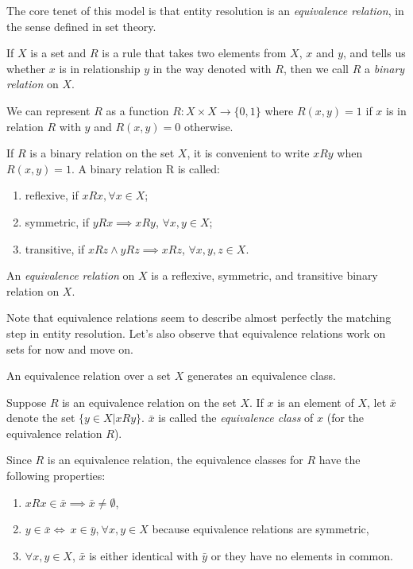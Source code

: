 \documentclass[journal]{IEEEtran}
\begin{document}
    The core tenet of this model is that entity resolution is an \textit{
    equivalence relation}, in the sense defined in set theory.
    
    \begin{defn} If $X$ is a set and $R$ is a rule that takes two elements from
    $X$, $x$ and $y$, and tells us whether $x$ is in relationship $y$ in the way
    denoted with $R$, then we call $R$ a \textit{binary relation} on
    $X$\cite{hoffman1971linear}.
    \end{defn}

    We can represent $R$ as a function $R:X \times X \rightarrow \{0,1\}$ where
    $R(x,y)=1$ if $x$ is in relation $R$ with $y$ and $R(x,y)=0$ otherwise.
    
    \begin{defn}If $R$ is a binary relation on the set $X$, it is convenient to
    write $xRy$ when $R(x, y) = 1$.
    A binary relation R is called:

    \begin{enumerate}
        \item reflexive, if $xRx, \forall x \in X$;
        \item symmetric, if $yRx \implies xRy$, $\forall x,y \in X$;
        \item transitive, if $xRz \land yRz \implies xRz$, $\forall x,y,z \in X$.
    \end{enumerate}

    An \textit{equivalence relation} on $X$ is a reflexive, symmetric, and
    transitive binary relation on $X$\cite{hoffman1971linear}.
    \end{defn}

    Note that equivalence relations seem to describe almost perfectly the
    matching step in entity resolution.
    Let's also observe that equivalence relations work on sets for now and move
    on.

    An equivalence relation over a set $X$ generates an equivalence class.

    \begin{defn}Suppose $R$ is an equivalence relation on the set $X$.
    If $x$ is an element of $X$, let $\bar{x}$ denote the set
    $\{y \in X | xRy\}$.
    $\bar{x}$ is called the \textit{equivalence class} of $x$ (for the
    equivalence relation $R$)\cite{hoffman1971linear}.
    \end{defn}

    Since $R$ is an equivalence relation, the equivalence classes for $R$ have the
    following properties\cite{hoffman1971linear}:
    \begin{enumerate}
        \item $xRx \in \bar{x} \implies \bar{x} \neq \emptyset$,
        \item $y\in\bar{x}\iff~x\in\bar{y}$,$~\forall x,y \in X$ because
        equivalence relations are symmetric,
        \item $\forall x,y \in X$, $\bar{x}$ is either identical with $\bar{y}$
        or they have no elements in common\cite{hoffman1971linear,Tal11}.
    \end{enumerate}
    
\end{document}
